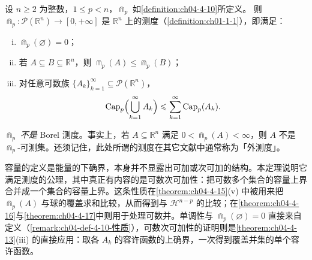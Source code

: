 \documentclass[../../main.tex]{subfiles}%
\begin{document}
\begin{theorem}[容量是测度]\label{theorem:ch04-4-14}
设 $n\geqslant2$ 为整数，$1\leqslant p<n$，$\Cap_p$ 如\cref{definition:ch04-4-10}所定义。%
则 $\Cap_p:\mathcal{P}(\mathbb{R}^n)\to[0,+\infty]$ 是 $\mathbb{R}^n$ 上的测度（\cref{definition:ch01-1-1}），即满足：%
\begin{enumerate}[(i)]
\item $\Cap_p(\varnothing)=0$；
\item 若 $A\subseteq B\subseteq\mathbb{R}^n$，则 $\Cap_p(A)\leqslant\Cap_p(B)$；
\item 对任意可数族 $\{A_k\}_{k=1}^{\infty}\subseteq\mathcal{P}(\mathbb{R}^n)$，
\begin{align*}
\Cap_p\Bigl(\bigcup_{k=1}^{\infty}A_k\Bigr)\leqslant\sum_{k=1}^{\infty}\Cap_p(A_k).
\end{align*}
\end{enumerate}
\end{theorem}

\begin{remark}\label{remark:ch04-thm-4-14-警告}
$\Cap_p$ \emph{不是} Borel 测度。事实上，若 $A\subseteq\mathbb{R}^n$ 满足 $0<\Cap_p(A)<\infty$，则 $A$ 不是 $\Cap_p$-可测集。还须记住，此处所谓的测度在其它文献中通常称为「外测度」。
\end{remark}

\begin{remark}\label{remark:ch04-thm-4-14-动机}
容量的定义是能量的下确界，本身并不显露出可加或次可加的结构。本定理说明它满足测度的公理，其中真正有内容的是可数次可加性：把可数多个集合的容量上界合并成一个集合的容量上界。这条性质在\cref{theorem:ch04-4-15}(v) 中被用来把 $\Cap_p(A)$ 与球的覆盖求和比较，从而得到与 $\mathcal{H}^{n-p}$ 的比较；在\cref{theorem:ch04-4-16}与\cref{theorem:ch04-4-17}中则用于处理可数并。单调性与 $\Cap_p(\varnothing)=0$ 直接来自定义（\cref{remark:ch04-def-4-10-性质}），可数次可加性的证明则是\cref{theorem:ch04-4-13}(iii) 的直接应用：取各 $A_k$ 的容许函数的上确界，一次得到覆盖并集的单个容许函数。%
\end{remark}
\end{document}
